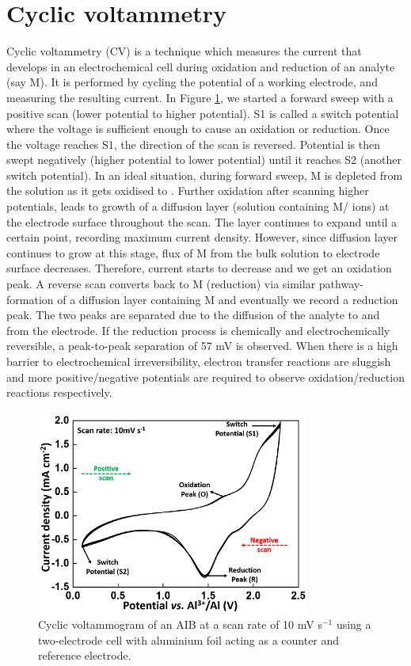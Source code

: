 \section{Cyclic voltammetry}
Cyclic voltammetry (CV) is a technique which measures the current that develops in an electrochemical cell during oxidation and reduction of an analyte (say M). It is performed by cycling the potential of a working electrode, and measuring the resulting current. In Figure \ref{Figures/chap2fig:CV}, we started a forward sweep with a positive scan (lower potential to higher potential). S1 is called a switch potential where the voltage is sufficient enough to cause an oxidation or reduction. Once the voltage reaches S1, the direction of the scan is reversed. Potential is then swept negatively (higher potential to lower potential) until it reaches S2 (another switch potential). In an ideal situation, during forward sweep, M is depleted from the solution as it gets oxidised to . Further oxidation after scanning higher potentials, leads to growth of a diffusion layer (solution containing M/ ions) at the electrode surface throughout the scan. The layer continues to expand until a certain point, recording maximum current density. However, since diffusion layer continues to grow at this stage, flux of M from the bulk solution to electrode surface decreases. Therefore, current starts to decrease and we get an oxidation peak. A reverse scan converts  back to M (reduction) via similar pathway- formation of a diffusion layer containing M and eventually we record a reduction peak. The two peaks are separated due to the diffusion of the analyte to and from the electrode. If the reduction process is chemically and electrochemically reversible, a peak-to-peak separation of 57 mV is observed. When there is a high barrier to electrochemical irreversibility, electron transfer reactions are sluggish and more positive/negative potentials are required to observe oxidation/reduction reactions respectively. 

\begin{figure}[tbh!]
\centering
\includegraphics[width=0.8\textwidth]{Figures/chap2fig/CV.pdf}
\caption{Cyclic voltammogram of an AIB at a scan rate of 10 mV s$^{-1}$ using a two-electrode cell with aluminium foil acting as a counter and reference electrode.}
\label{Figures/chap2fig:CV}
\end{figure}

